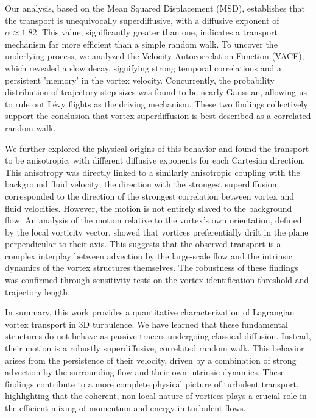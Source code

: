 \documentclass[]{article}
\begin{document}
Our analysis, based on the Mean Squared Displacement (MSD), establishes that the transport is unequivocally superdiffusive, with a diffusive exponent of $\alpha \approx 1.82$. This value, significantly greater than one, indicates a transport mechanism far more efficient than a simple random walk. To uncover the underlying process, we analyzed the Velocity Autocorrelation Function (VACF), which revealed a slow decay, signifying strong temporal correlations and a persistent 'memory' in the vortex velocity. Concurrently, the probability distribution of trajectory step sizes was found to be nearly Gaussian, allowing us to rule out Lévy flights as the driving mechanism. These two findings collectively support the conclusion that vortex superdiffusion is best described as a correlated random walk.

We further explored the physical origins of this behavior and found the transport to be anisotropic, with different diffusive exponents for each Cartesian direction. This anisotropy was directly linked to a similarly anisotropic coupling with the background fluid velocity; the direction with the strongest superdiffusion corresponded to the direction of the strongest correlation between vortex and fluid velocities. However, the motion is not entirely slaved to the background flow. An analysis of the motion relative to the vortex's own orientation, defined by the local vorticity vector, showed that vortices preferentially drift in the plane perpendicular to their axis. This suggests that the observed transport is a complex interplay between advection by the large-scale flow and the intrinsic dynamics of the vortex structures themselves. The robustness of these findings was confirmed through sensitivity tests on the vortex identification threshold and trajectory length.

In summary, this work provides a quantitative characterization of Lagrangian vortex transport in 3D turbulence. We have learned that these fundamental structures do not behave as passive tracers undergoing classical diffusion. Instead, their motion is a robustly superdiffusive, correlated random walk. This behavior arises from the persistence of their velocity, driven by a combination of strong advection by the surrounding flow and their own intrinsic dynamics. These findings contribute to a more complete physical picture of turbulent transport, highlighting that the coherent, non-local nature of vortices plays a crucial role in the efficient mixing of momentum and energy in turbulent flows.


{}

\end{document}
